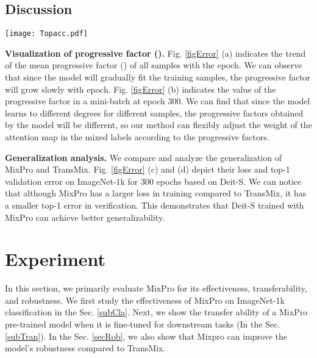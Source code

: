\documentclass{article} \usepackage{iclr2023_conference,times}
\begin{document}
\subsection{Discussion}
\begin{figure*}[!htb]
\centering
\texttt{[image: Topacc.pdf]}

\caption{Visualization of progressive factor () and generalization analysis of our MixPro and TransMix. We employ Mixpro and TransMix based on Deit-S on ImageNet-1k for 300 epochs. Figures (a) and (b), demonstrate the visualization of the progressive factor (). Figures (c) and (d) depict their loss and top-1 validation error on ImageNet-1k. MixPro provides improved generalization compared to TransMix.}
\label{figError}
\vspace{-10px}
\end{figure*}
\textbf{Visualization of progressive factor ().}
Fig. \ref{figError} (a) indicates the trend of the mean progressive factor () of all samples with the epoch. We can observe that since the model will gradually fit the training samples, the progressive factor will grow slowly with epoch. Fig. \ref{figError} (b) indicates the value of the progressive factor in a mini-batch at epoch 300. We can find that since the model learns to different degrees for different samples, the progressive factors obtained by the model will be different, so our method can flexibly adjust the weight of the attention map in the mixed labels according to the progressive factors.


\textbf{Generalization analysis.} We compare and analyze the generalization of MixPro and TransMix. Fig. \ref{figError} (c) and (d) depict their loss and top-1 validation error on ImageNet-1k for 300 epochs based on Deit-S. We can notice that although MixPro has a larger loss in training compared to TransMix, it has a smaller top-1 error in verification. This demonstrates that Deit-S trained with MixPro can achieve better generalizability.

\section{Experiment}
\label{subExp}

In this section, we primarily evaluate MixPro for its effectiveness, transferability, and robustness. We first study the effectiveness of MixPro on ImageNet-1k classification in the Sec. \ref{subCla}. Next, we show the transfer ability of a MixPro pre-trained model when it is fine-tuned for downstream tasks (In the Sec. \ref{subTran}). In the Sec. \ref{secRob}, we also show that Mixpro can improve the model's robustness compared to TransMix.
\end{document}
